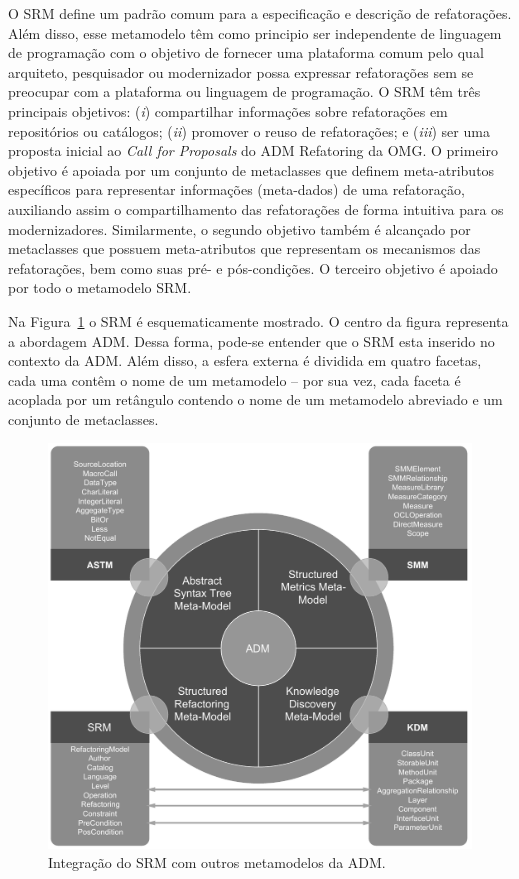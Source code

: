 O SRM define um padrão comum para a especificação e descrição de refatorações. Além disso, esse metamodelo têm como principio ser independente de linguagem de programação com o objetivo de fornecer uma plataforma comum pelo qual arquiteto, pesquisador ou modernizador possa expressar refatorações sem se preocupar com a plataforma ou linguagem de programação. O SRM têm três principais objetivos: (\textit{i}) compartilhar informações sobre refatorações em repositórios ou catálogos; (\textit{ii}) promover o reuso de refatorações; e (\textit{iii}) ser uma proposta inicial ao \textit{Call for Proposals} do ADM Refatoring da OMG. O primeiro objetivo é apoiada por um conjunto de metaclasses que definem meta-atributos específicos para representar informações (meta-dados) de uma refatoração, auxiliando assim o compartilhamento das refatorações de forma intuitiva para os modernizadores. Similarmente, o segundo objetivo também é alcançado por metaclasses que possuem meta-atributos que representam os mecanismos das refatorações, bem como suas pré- e pós-condições. O terceiro objetivo é apoiado por todo o metamodelo SRM.

Na Figura~\ref{fig:refactoring_metamodel} o SRM é esquematicamente mostrado. O centro da figura representa a abordagem ADM. Dessa forma, pode-se entender que o SRM esta inserido no contexto da ADM. Além disso, a esfera externa é dividida em quatro facetas, cada uma contêm o nome de um metamodelo – por sua vez, cada faceta é acoplada por um retângulo contendo o nome de um metamodelo abreviado e um conjunto de metaclasses. 

\begin{figure}[h]
	\centering
	\caption{Integração do SRM com outros metamodelos da ADM.}
	\label{fig:refactoring_metamodel}
	\includegraphics[scale=0.65]{images/SRM2Formatted}
	\fautor
\end{figure}

